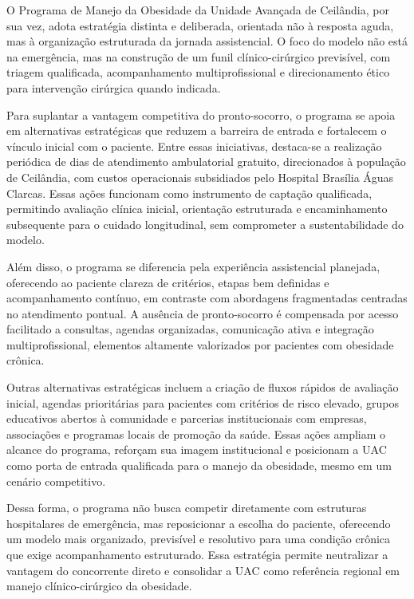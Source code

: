 \documentclass[12pt]{article}
\begin{document}
O Programa de Manejo da Obesidade da Unidade Avançada de Ceilândia, por sua vez, adota estratégia distinta e deliberada, orientada não à resposta aguda, mas à organização estruturada da jornada assistencial. O foco do modelo não está na emergência, mas na construção de um funil clínico-cirúrgico previsível, com triagem qualificada, acompanhamento multiprofissional e direcionamento ético para intervenção cirúrgica quando indicada.

Para suplantar a vantagem competitiva do pronto-socorro, o programa se apoia em alternativas estratégicas que reduzem a barreira de entrada e fortalecem o vínculo inicial com o paciente. Entre essas iniciativas, destaca-se a realização periódica de dias de atendimento ambulatorial gratuito, direcionados à população de Ceilândia, com custos operacionais subsidiados pelo Hospital Brasília Águas Clarcas. Essas ações funcionam como instrumento de captação qualificada, permitindo avaliação clínica inicial, orientação estruturada e encaminhamento subsequente para o cuidado longitudinal, sem comprometer a sustentabilidade do modelo.

Além disso, o programa se diferencia pela experiência assistencial planejada, oferecendo ao paciente clareza de critérios, etapas bem definidas e acompanhamento contínuo, em contraste com abordagens fragmentadas centradas no atendimento pontual. A ausência de pronto-socorro é compensada por acesso facilitado a consultas, agendas organizadas, comunicação ativa e integração multiprofissional, elementos altamente valorizados por pacientes com obesidade crônica.

Outras alternativas estratégicas incluem a criação de fluxos rápidos de avaliação inicial, agendas prioritárias para pacientes com critérios de risco elevado, grupos educativos abertos à comunidade e parcerias institucionais com empresas, associações e programas locais de promoção da saúde. Essas ações ampliam o alcance do programa, reforçam sua imagem institucional e posicionam a UAC como porta de entrada qualificada para o manejo da obesidade, mesmo em um cenário competitivo.

Dessa forma, o programa não busca competir diretamente com estruturas hospitalares de emergência, mas reposicionar a escolha do paciente, oferecendo um modelo mais organizado, previsível e resolutivo para uma condição crônica que exige acompanhamento estruturado. Essa estratégia permite neutralizar a vantagem do concorrente direto e consolidar a UAC como referência regional em manejo clínico-cirúrgico da obesidade.
\end{document}
